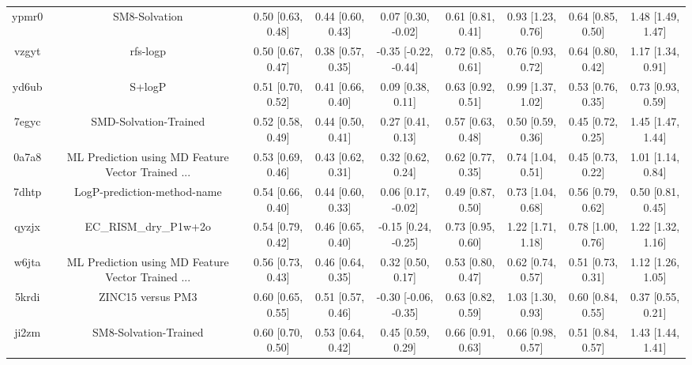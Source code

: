 \documentclass{article}
\begin{document}
\begin{center}
\begin{longtable}{|ccccccccc|}
 ypmr0 &                                      SM8-Solvation &  0.50 [0.63, 0.48] &  0.44 [0.60, 0.43] &    0.07 [0.30, -0.02] &  0.61 [0.81, 0.41] &     0.93 [1.23, 0.76] &     0.64 [0.85, 0.50] &     1.48 [1.49, 1.47] \\
 vzgyt &                                           rfs-logp &  0.50 [0.67, 0.47] &  0.38 [0.57, 0.35] &  -0.35 [-0.22, -0.44] &  0.72 [0.85, 0.61] &     0.76 [0.93, 0.72] &     0.64 [0.80, 0.42] &     1.17 [1.34, 0.91] \\
 yd6ub &                                             S+logP &  0.51 [0.70, 0.52] &  0.41 [0.66, 0.40] &     0.09 [0.38, 0.11] &  0.63 [0.92, 0.51] &     0.99 [1.37, 1.02] &     0.53 [0.76, 0.35] &     0.73 [0.93, 0.59] \\
 7egyc &                              SMD-Solvation-Trained &  0.52 [0.58, 0.49] &  0.44 [0.50, 0.41] &     0.27 [0.41, 0.13] &  0.57 [0.63, 0.48] &     0.50 [0.59, 0.36] &     0.45 [0.72, 0.25] &     1.45 [1.47, 1.44] \\
 0a7a8 &  ML Prediction using MD Feature Vector Trained ... &  0.53 [0.69, 0.46] &  0.43 [0.62, 0.31] &     0.32 [0.62, 0.24] &  0.62 [0.77, 0.35] &     0.74 [1.04, 0.51] &     0.45 [0.73, 0.22] &     1.01 [1.14, 0.84] \\
 7dhtp &                        LogP-prediction-method-name &  0.54 [0.66, 0.40] &  0.44 [0.60, 0.33] &    0.06 [0.17, -0.02] &  0.49 [0.87, 0.50] &     0.73 [1.04, 0.68] &     0.56 [0.79, 0.62] &     0.50 [0.81, 0.45] \\
 qyzjx &                              EC\_RISM\_dry\_P1w+2o &  0.54 [0.79, 0.42] &  0.46 [0.65, 0.40] &   -0.15 [0.24, -0.25] &  0.73 [0.95, 0.60] &     1.22 [1.71, 1.18] &     0.78 [1.00, 0.76] &     1.22 [1.32, 1.16] \\
 w6jta &  ML Prediction using MD Feature Vector Trained ... &  0.56 [0.73, 0.43] &  0.46 [0.64, 0.35] &     0.32 [0.50, 0.17] &  0.53 [0.80, 0.47] &     0.62 [0.74, 0.57] &     0.51 [0.73, 0.31] &     1.12 [1.26, 1.05] \\
 5krdi &                                  ZINC15 versus PM3 &  0.60 [0.65, 0.55] &  0.51 [0.57, 0.46] &  -0.30 [-0.06, -0.35] &  0.63 [0.82, 0.59] &     1.03 [1.30, 0.93] &     0.60 [0.84, 0.55] &     0.37 [0.55, 0.21] \\
 ji2zm &                              SM8-Solvation-Trained &  0.60 [0.70, 0.50] &  0.53 [0.64, 0.42] &     0.45 [0.59, 0.29] &  0.66 [0.91, 0.63] &     0.66 [0.98, 0.57] &     0.51 [0.84, 0.57] &     1.43 [1.44, 1.41] \\

\end{longtable}
\end{center}
\end{document}
